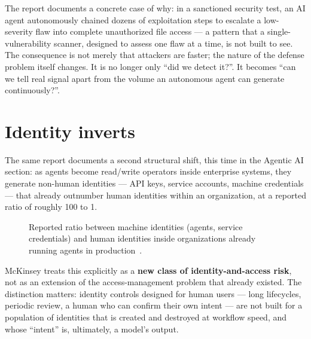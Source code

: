\documentclass[10pt]{article}
\begin{document}
The report documents a concrete case of why: in a sanctioned security test, an AI agent autonomously chained dozens of exploitation steps to escalate a low-severity flaw into complete unauthorized file access --- a pattern that a single-vulnerability scanner, designed to assess one flaw at a time, is not built to see. The consequence is not merely that attackers are faster; the nature of the defense problem itself changes. It is no longer only ``did we detect it?''. It becomes ``can we tell real signal apart from the volume an autonomous agent can generate continuously?''.

\section{Identity inverts}

The same report documents a second structural shift, this time in the Agentic AI section: as agents become read/write operators inside enterprise systems, they generate non-human identities --- API keys, service accounts, machine credentials --- that already outnumber human identities within an organization, at a reported ratio of roughly 100 to 1.

\begin{figure}[h]
\centering
{}
\caption{Reported ratio between machine identities (agents, service credentials) and human identities inside organizations already running agents in production~\cite{mckinsey2026}.}
\label{fig:identity}
\end{figure}

McKinsey treats this explicitly as a \textbf{new class of identity-and-access risk}, not as an extension of the access-management problem that already existed. The distinction matters: identity controls designed for human users --- long lifecycles, periodic review, a human who can confirm their own intent --- are not built for a population of identities that is created and destroyed at workflow speed, and whose ``intent'' is, ultimately, a model's output.
\end{document}
